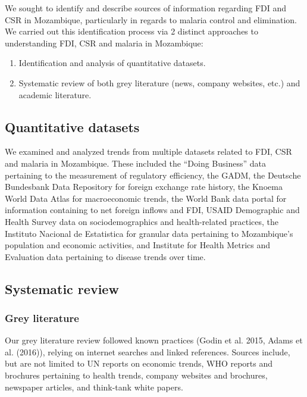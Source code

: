 \documentclass[]{elsarticle} %
\providecommand{\tightlist}{%
  \setlength{\itemsep}{0pt}\setlength{\parskip}{0pt}}
\begin{document}
We sought to identify and describe sources of information regarding FDI
and CSR in Mozambique, particularly in regards to malaria control and
elimination. We carried out this identification process via 2 distinct
approaches to understanding FDI, CSR and malaria in Mozambique:

\begin{enumerate}
\def\labelenumi{\arabic{enumi}.}
\tightlist
\item
  Identification and analysis of quantitative datasets.
\item
  Systematic review of both grey literature (news, company websites,
  etc.) and academic literature.
\end{enumerate}

\subsection{Quantitative datasets}\label{quantitative-datasets}

We examined and analyzed trends from multiple datasets related to FDI,
CSR and malaria in Mozambique. These included the ``Doing Business''
data pertaining to the measurement of regulatory efficiency, the GADM,
the Deutsche Bundesbank Data Repository for foreign exchange rate
history, the Knoema World Data Atlas for macroeconomic trends, the World
Bank data portal for information containing to net foreign inflows and
FDI, USAID Demographic and Health Survey data on sociodemographics and
health-related practices, the Instituto Nacional de Estatistica for
granular data pertaining to Mozambique's population and economic
activities, and Institute for Health Metrics and Evaluation data
pertaining to disease trends over time.

\subsection{Systematic review}\label{systematic-review}

\subsubsection{Grey literature}\label{grey-literature}

Our grey literature review followed known practices (Godin et al. 2015,
Adams et al. (2016)), relying on internet searches and linked
references. Sources include, but are not limited to UN reports on
economic trends, WHO reports and brochures pertaining to health trends,
company websites and brochures, newspaper articles, and think-tank white
papers.
\end{document}
